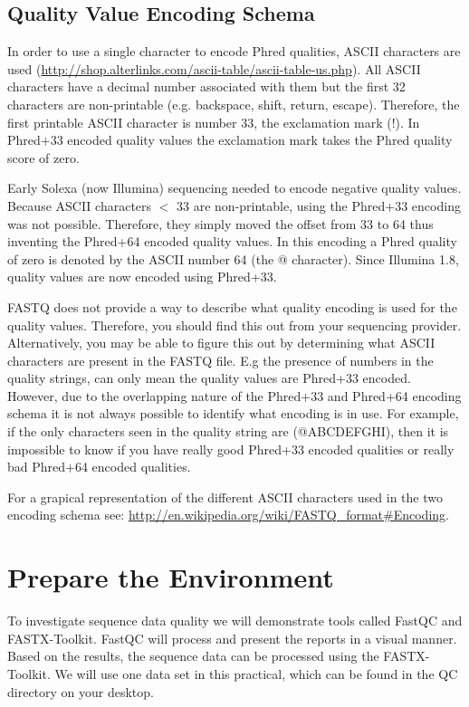 \subsection{Quality Value Encoding Schema}

In order to use a single character to encode Phred qualities, ASCII characters
are used (\url{http://shop.alterlinks.com/ascii-table/ascii-table-us.php}). All ASCII characters have a decimal
number associated with them but the first 32 characters are non-printable (e.g.
backspace, shift, return, escape). Therefore, the first printable ASCII
character is number 33, the exclamation mark (!). In Phred+33 encoded quality
values the exclamation mark takes the Phred quality score of zero.

Early Solexa (now Illumina) sequencing needed to encode negative quality values.
Because ASCII characters $<$ 33 are non-printable, using the Phred+33 encoding was
not possible. Therefore, they simply moved the offset from 33 to 64 thus
inventing the Phred+64 encoded quality values. In this encoding a Phred quality
of zero is denoted by the ASCII number 64 (the @ character). Since Illumina 1.8,
quality values are now encoded using Phred+33.

FASTQ does not provide a way to describe what quality encoding is used for the
quality values. Therefore, you should find this out from your sequencing
provider. Alternatively, you may be able to figure this out by determining what
ASCII characters are present in the FASTQ file. E.g the presence of numbers in
the quality strings, can only mean the quality values are Phred+33 encoded.
However, due to the overlapping nature of the Phred+33 and Phred+64 encoding
schema it is not always possible to identify what encoding is in use. For
example, if the only characters seen in the quality string are (@ABCDEFGHI),
then it is impossible to know if you have really good Phred+33 encoded qualities
or really bad Phred+64 encoded qualities.

For a grapical representation of the different ASCII characters used in the two
encoding schema see: \url{http://en.wikipedia.org/wiki/FASTQ_format#Encoding}.

\section{Prepare the Environment}

\begin{information}
To investigate sequence data quality we will demonstrate tools called FastQC
and FASTX-Toolkit. FastQC will process and present the reports in a visual manner.
Based on the results, the sequence data can be processed using the FASTX-Toolkit.
We will use one data set in this practical, which can be found in the QC
directory on your desktop.
\end{information}

